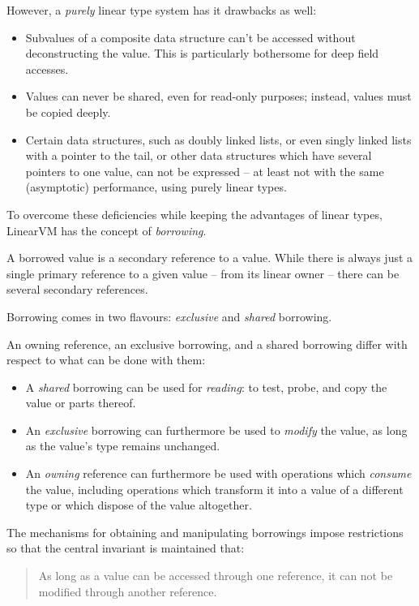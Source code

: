 \documentclass[a4paper]{book}
\begin{document}
\noindent
However, a \emph{purely} linear type system has it drawbacks as well:
\begin{itemize}
\item Subvalues of a composite data structure can't be accessed
  without deconstructing the value. This is particularly bothersome
  for deep field accesses.

\item Values can never be shared, even for read-only purposes; instead,
  values must be copied deeply.

\item Certain data structures, such as doubly linked lists, or even
  singly linked lists with a pointer to the tail, or other data
  structures which have several pointers to one value, can not be
  expressed -- at least not with the same (asymptotic) performance,
  using purely linear types.
\end{itemize}

To overcome these deficiencies while keeping the advantages of linear types,
LinearVM has the concept of \emph{borrowing}.

A borrowed value is a secondary reference to a value.
While there is always just a single primary reference to a given value
-- from its linear owner -- there can be several secondary references.

Borrowing comes in two flavours: \emph{exclusive} and \emph{shared} borrowing.

An owning reference, an exclusive borrowing, and a shared borrowing differ
with respect to what can be done with them:
\begin{itemize}
\item A \emph{shared} borrowing can be used for \emph{reading}: to test,
  probe, and copy the value or parts thereof.
\item An \emph{exclusive} borrowing can furthermore be used to \emph{modify} the value,
  as long as the value's type remains unchanged.

\item An \emph{owning} reference can furthermore be used with
  operations which \emph{consume} the value, including operations
  which transform it into a value of a different type or which dispose
  of the value altogether.
\end{itemize}

The mechanisms for obtaining and manipulating borrowings impose restrictions
so that the central invariant is maintained that:
\begin{quote}
  As long as a value can be accessed through one reference,
  it can not be modified through another reference.
\end{quote}
\end{document}
